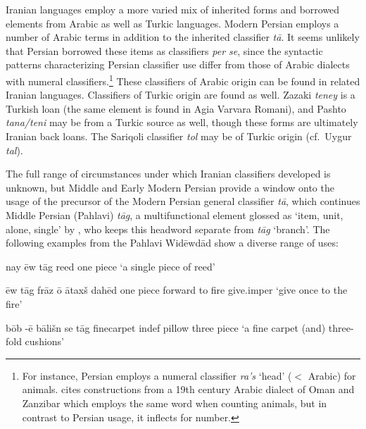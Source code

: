 \documentclass[11pt]{article}
\begin{document}
Iranian languages employ a more varied mix of inherited forms and borrowed elements from Arabic as well as Turkic languages. 
Modern Persian employs a number of Arabic terms in addition to the inherited classifier {\it t\=a}. It seems unlikely that Persian borrowed these items as classifiers {\it per se}, since the syntactic patterns characterizing Persian classifier use differ from those of Arabic dialects with numeral classifiers.\footnote{For instance, Persian employs a numeral classifier {\it ra's} `head' ($<$ Arabic) for animals. \citet[18--20]{Greenberg1972} cites constructions from a 19th century Arabic dialect of Oman and Zanzibar %
which employs the same word when counting animals, but in contrast to Persian usage, it inflects for number.} 
These classifiers of Arabic origin can be found in related Iranian languages. 
Classifiers of Turkic origin are found as well. Zazaki {\it teney} is a Turkish loan (the same element is found in Agia Varvara Romani), and Pashto {\it tana/teni} may be from a Turkic source as well, though these forms are ultimately Iranian back loans. The Sariqoli classifier {\it tol} may be of Turkic origin (cf.\ Uygur {\it tal}).

The full range of circumstances under which Iranian classifiers developed is unknown, but Middle and Early Modern Persian provide a window onto the usage of the precursor of the Modern Persian general classifier {\it t\=a}, which continues Middle Persian (Pahlavi) {\it t\=ag}, a multifunctional element glossed as `item, unit, alone, single' by \citet{Mackenzie1971}, who keeps this headword separate from {\it t\=ag} `branch'.
The following examples from the Pahlavi Wid\=ewd\=ad show a diverse range of uses:
\begin{examples}
\item \gll nay \=ew t\=ag
reed one piece
\glt `a single piece of reed' \citep[272]{Moazami2014}
\glend
\end{examples}

\begin{examples}
\item \gll \=ew t\=ag fr\=az \=o \=atax\v{s} dah\=ed
one piece forward to fire give.{\sc imper}
\glt `give once to the fire' \citep[254]{Moazami2014}
\glend
\end{examples}

\begin{examples}
\item \gll b\=ob -\=e b\=ali\v{s}n se t\=ag
fine\underline{\phantom{ }}carpet {\sc indef} pillow three piece
\glt `a fine carpet (and) three-fold cushions' \citep[352]{Moazami2014}
\glend
\end{examples}
\end{document}
